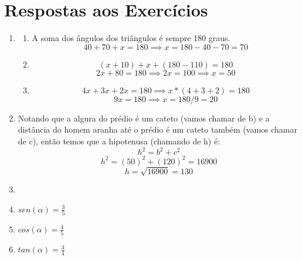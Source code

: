 \documentclass[11pt]{article}
\begin{document}
\section{Respostas aos Exercícios}
\begin{enumerate}
	\item 
		\begin{enumerate}
			\item A soma dos ângulos dos triângulos é sempre 180 graus.
				$$40 + 70 + x = 180 \implies x = 180 - 40 - 70 = 70$$
			\item $$(x + 10) + x + (180 - 110) = 180$$
				$$2x + 80 = 180 \implies 2x = 100 \implies x = 50$$
			\item $$4x + 3x + 2x = 180 \implies x*(4 + 3 + 2) = 180$$
				$$9x = 180 \implies x = 180/9 = 20$$
		\end{enumerate}

	\item Notando que a algura do prédio é um cateto (vamos chamar de b) 
		e a distância do homem aranha até o prédio é um cateto também
		(vamos chamar de c), então temos que a hipotenusa (chamando de h) é:
		$$h^2 = b^2 + c^2$$
		$$h^2 = {(50)}^2 + {(120)}^2 = 16900$$
		$$h = \sqrt{16900} = 130$$

	\item
		\item $sen(\alpha) = \frac{3}{5}$
		\item $cos(\alpha) = \frac{4}{5}$
		\item $tan(\alpha) = \frac{3}{4}$
\end{enumerate}
\end{document}
